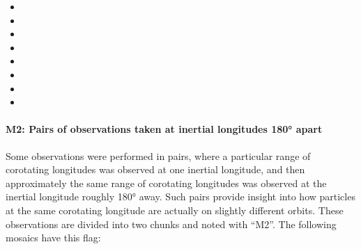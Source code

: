 \begin{itemize}
\item {}
\item {}
\item {}
\item {}
\item {}
\item {}
\item {}
\item {}
\end{itemize}

\paragraph{M2: Pairs of observations taken at inertial longitudes 180° apart}
\label{sec:m2-pairs-of-observations-taken-at-inertial-longi}

Some observations were performed in pairs, where a particular range of corotating longitudes was observed at one inertial longitude, and then approximately the same range of corotating longitudes was observed at the inertial longitude roughly 180° away. Such pairs provide insight into how particles at the same corotating longitude are actually on slightly different orbits. These observations are divided into two chunks and noted with “M2”. The following mosaics have this flag:

